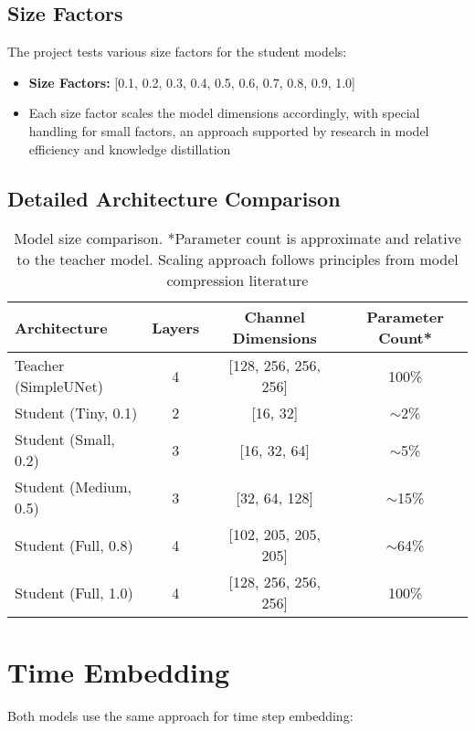 \documentclass{article}
\begin{document}
\subsection{Size Factors}

The project tests various size factors for the student models:
\begin{itemize}
  \item \textbf{Size Factors:} [0.1, 0.2, 0.3, 0.4, 0.5, 0.6, 0.7, 0.8, 0.9, 1.0]
  \item Each size factor scales the model dimensions accordingly, with special handling for small factors, an approach supported by research in model efficiency \citep{tan2019efficientnet} and knowledge distillation \citep{hinton2015distilling}
\end{itemize}

\subsection{Detailed Architecture Comparison}

\begin{table}[h]
\centering
\begin{tabular}{lccc}
\toprule
\textbf{Architecture} & \textbf{Layers} & \textbf{Channel Dimensions} & \textbf{Parameter Count*} \\
\midrule
Teacher (SimpleUNet) & 4 & [128, 256, 256, 256] & 100\% \\
\midrule
Student (Tiny, 0.1) & 2 & [16, 32] & $\sim$2\% \\
Student (Small, 0.2) & 3 & [16, 32, 64] & $\sim$5\% \\
Student (Medium, 0.5) & 3 & [32, 64, 128] & $\sim$15\% \\
Student (Full, 0.8) & 4 & [102, 205, 205, 205] & $\sim$64\% \\
Student (Full, 1.0) & 4 & [128, 256, 256, 256] & 100\% \\
\bottomrule
\end{tabular}
\caption{Model size comparison. *Parameter count is approximate and relative to the teacher model. Scaling approach follows principles from model compression literature \citep{luhman2021knowledge, salimans2022progressive}}
\end{table}

\section{Time Embedding}

Both models use the same approach for time step embedding:
\end{document}
